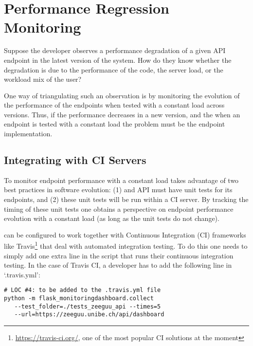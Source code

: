 


\newpage
  \section{Performance Regression Monitoring}

  Suppose the developer observes a performance degradation of a given API endpoint in the latest version of the system. How do they know whether the degradation is due to the performance of the code, the server load, or the workload mix of the user? 

  \vspace{0.1cm}

  
  One way of triangulating such an observation is by monitoring the evolution of the performance of the endpoints when tested with a constant load across versions. Thus, if the performance decreases in a new version, and the  when an endpoint is tested with a constant load the problem must be the endpoint implementation. 

  \subsection*{Integrating with CI Servers}

  To monitor endpoint performance with a constant load \tool takes advantage of two best practices in software evolution: (1) and API must have unit tests for its endpoints, and (2) these unit tests will be run within a CI server. By tracking the timing of these unit tests one obtains a perspective on endpoint performance evolution with a constant load (as long as the unit tests do not change). 

  \tool can be configured to work together with Continuous Integration (CI) frameworks like Travis\footnote{\url{https://travis-ci.org/}, one of the most popular CI solutions at the moment} that deal with automated integration testing. To do this one needs to simply add one extra line in the script that runs their continuous integration testing. In the case of Travis CI, a developer has to add the following line in `.travis.yml': 


  \begin{lstlisting}[style=custompython]  
# LOC #4: to be added to the .travis.yml file
python -m flask_monitoringdashboard.collect
   --test_folder=./tests_zeeguu_api --times=5 
   --url=https://zeeguu.unibe.ch/api/dashboard

  \end{lstlisting}

